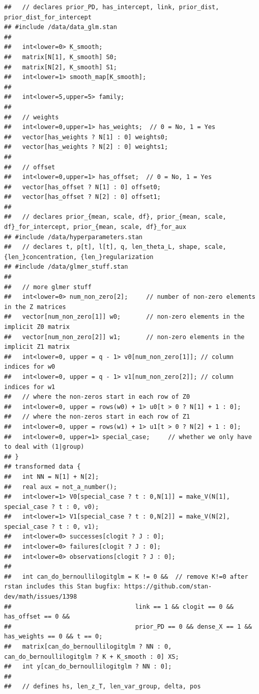 \documentclass[
]{article}
\begin{document}
\begin{verbatim}
##   // declares prior_PD, has_intercept, link, prior_dist, prior_dist_for_intercept
## #include /data/data_glm.stan
## 
##   int<lower=0> K_smooth;
##   matrix[N[1], K_smooth] S0;
##   matrix[N[2], K_smooth] S1;
##   int<lower=1> smooth_map[K_smooth];
##   
##   int<lower=5,upper=5> family;
## 
##   // weights
##   int<lower=0,upper=1> has_weights;  // 0 = No, 1 = Yes
##   vector[has_weights ? N[1] : 0] weights0;
##   vector[has_weights ? N[2] : 0] weights1;
##   
##   // offset
##   int<lower=0,upper=1> has_offset;  // 0 = No, 1 = Yes
##   vector[has_offset ? N[1] : 0] offset0;
##   vector[has_offset ? N[2] : 0] offset1;
##   
##   // declares prior_{mean, scale, df}, prior_{mean, scale, df}_for_intercept, prior_{mean, scale, df}_for_aux
## #include /data/hyperparameters.stan
##   // declares t, p[t], l[t], q, len_theta_L, shape, scale, {len_}concentration, {len_}regularization
## #include /data/glmer_stuff.stan
## 
##   // more glmer stuff
##   int<lower=0> num_non_zero[2];     // number of non-zero elements in the Z matrices
##   vector[num_non_zero[1]] w0;       // non-zero elements in the implicit Z0 matrix
##   vector[num_non_zero[2]] w1;       // non-zero elements in the implicit Z1 matrix
##   int<lower=0, upper = q - 1> v0[num_non_zero[1]]; // column indices for w0
##   int<lower=0, upper = q - 1> v1[num_non_zero[2]]; // column indices for w1
##   // where the non-zeros start in each row of Z0
##   int<lower=0, upper = rows(w0) + 1> u0[t > 0 ? N[1] + 1 : 0];  
##   // where the non-zeros start in each row of Z1
##   int<lower=0, upper = rows(w1) + 1> u1[t > 0 ? N[2] + 1 : 0];  
##   int<lower=0, upper=1> special_case;     // whether we only have to deal with (1|group)
## }
## transformed data {
##   int NN = N[1] + N[2];
##   real aux = not_a_number();
##   int<lower=1> V0[special_case ? t : 0,N[1]] = make_V(N[1], special_case ? t : 0, v0);
##   int<lower=1> V1[special_case ? t : 0,N[2]] = make_V(N[2], special_case ? t : 0, v1);
##   int<lower=0> successes[clogit ? J : 0];
##   int<lower=0> failures[clogit ? J : 0];
##   int<lower=0> observations[clogit ? J : 0];
## 
##   int can_do_bernoullilogitglm = K != 0 &&  // remove K!=0 after rstan includes this Stan bugfix: https://github.com/stan-dev/math/issues/1398
##                                  link == 1 && clogit == 0 && has_offset == 0 && 
##                                  prior_PD == 0 && dense_X == 1 && has_weights == 0 && t == 0;
##   matrix[can_do_bernoullilogitglm ? NN : 0, can_do_bernoullilogitglm ? K + K_smooth : 0] XS;
##   int y[can_do_bernoullilogitglm ? NN : 0];
## 
##   // defines hs, len_z_T, len_var_group, delta, pos

\end{verbatim}
\end{document}
